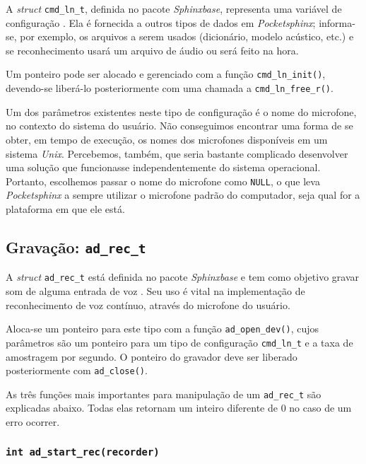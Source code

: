 A \textit{struct} \texttt{cmd\_ln\_t}, definida no pacote \textit{Sphinxbase}, representa uma variável de configuração \citep{pocketsphinxInstallUse}. Ela é fornecida a outros tipos de dados em \textit{Pocketsphinx}; informa-se, por exemplo, os arquivos a serem usados (dicionário, modelo acústico, etc.) e se reconhecimento usará um arquivo de áudio ou será feito na hora.

Um ponteiro pode ser alocado e gerenciado com a função \texttt{cmd\_ln\_init()}, devendo-se liberá-lo posteriormente com uma chamada a \texttt{cmd\_ln\_free\_r()}.

Um dos parâmetros existentes neste tipo de configuração é o nome do microfone, no contexto do sistema do usuário. Não conseguimos encontrar uma forma de se obter, em tempo de execução, os nomes dos microfones disponíveis em um sistema \textit{Unix}. Percebemos, também, que seria bastante complicado desenvolver uma solução que funcionasse independentemente do sistema operacional. Portanto, escolhemos passar o nome do microfone como \texttt{NULL}, o que leva \textit{Pocketsphinx} a sempre utilizar o microfone padrão do computador, seja qual for a plataforma em que ele está.


\subsection{Gravação: \texttt{ad\_rec\_t}}

A \textit{struct} \texttt{ad\_rec\_t} está definida no pacote \textit{Sphinxbase} e tem como objetivo gravar som de alguma entrada de voz \citep{pocketsphinxInstallUse}. Seu uso é vital na implementação de reconhecimento de voz contínuo, através do microfone do usuário.

Aloca-se um ponteiro para este tipo com a função \texttt{ad\_open\_dev()}, cujos parâmetros são um ponteiro para um tipo de configuração \texttt{cmd\_ln\_t} e a taxa de amostragem por segundo. O ponteiro do gravador deve ser liberado posteriormente  com \texttt{ad\_close()}.

As três funções mais importantes para manipulação de um \texttt{ad\_rec\_t} são explicadas abaixo. Todas elas retornam um inteiro diferente de 0 no caso de um erro ocorrer.

\subsubsection{\texttt{int ad\_start\_rec(recorder)}}

